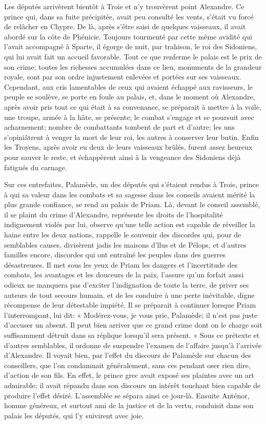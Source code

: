 \documentclass{article}
\begin{document}
\beginnumbering
\pstart
Les députés arrivèrent bientôt à Troie et n'y trouvèrent point Alexandre. Ce prince qui, dans sa fuite précipitée, avait peu consulté les vents, s'était vu forcé de relâcher en Chypre. De là, après s'être saisi de quelques vaisseaux, il avait abordé sur la côte de Phénicie. Toujours tourmenté par cette même avidité qui l'avait accompagné à Sparte, il égorge de nuit, par trahison, le roi des Sidoniens, qui lui avait fait un accueil favorable. Tout ce que renferme le palais est le prix de son crime; toutes les richesses accumulées dans ce lieu, monuments de la grandeur royale, sont par son ordre injustement enlevées et portées sur ses vaisseaux. Cependant, aux cris lamentables de ceux qui avaient échappé aux ravisseurs, le peuple se soulève, se porte en foule au palais, et, dans le moment où Alexandre, après avoir pris tout ce qui était à sa convenance, se préparait à mettre à la voile, une troupe, armée à la hâte, se présente; le combat s'engage et se poursuit avec acharnement; nombre de combattants tombent de part et d'autre; les uns s'opiniâtrent à venger la mort de leur roi, les autres à conserver leur butin. Enfin les Troyens, après avoir eu deux de leurs vaisseaux brûlés, furent assez heureux pour sauver le reste, et échappèrent ainsi à la vengeance des Sidoniens déjà fatigués du carnage.

Sur ces entrefaites, Palamède, un des députés qui s'étaient rendus à Troie, prince à qui sa valeur dans les combats et sa sagesse dans les conseils avaient mérité la plus grande confiance, se rend au palais de Priam. Là, devant le conseil assemblé, il se plaint du crime d'Alexandre, représente les droits de l'hospitalité indignement violés par lui, observe qu'une telle action est capable de réveiller la haine entre les deux nations, rappelle le souvenir des discordes qui, pour de semblables causes, divisèrent jadis les maisons d'llus et de Pélops, et d'autres familles encore, discordes qui ont entraîné les peuples dans des guerres désastreuses. Il met sous les yeux de Priam les dangers et l'incertitude des combats, les avantages et les douceurs de la paix, l'assure qu'un forfait aussi odieux ne manquera pas d'exciter l'indignation de toute la terre, de priver ses auteurs de tout secours humain, et de les conduire à une perte inévitable, digne récompense de leur détestable impiété. Il se préparait à continuer lorsque Priam l'interrompant, lui dit:
« Modérez-vous, je vous prie, Palamède; il n'est pas juste d'accuser un absent. Il peut bien arriver que ce grand crime dont on le charge soit suffisamment détruit dans sa réplique lorsqu'il sera présent. »
Sous ce prétexte et d'autres semblables, il ordonne de suspendre l'examen de l'affaire jusqu'à l'arrivée d'Alexandre. Il voyait bien, par l'effet du discours de Palamède sur chacun des conseillers, que l'on condamnait généralement, sans ces pendant oser rien dire, d'action de son fils. En effet, le prince grec avait exposé ses plaintes avec un art admirable; il avait répandu dans son discours un intérêt touchant bien capable de produire l'effet désiré. L'assemblée se sépara ainsi ce jour-là. Ensuite Anténor, homme généreux, et surtout ami de la justice et de la vertu, conduisit dans son palais les députés, qui l'y suivirent avec joie.
\end{document}
